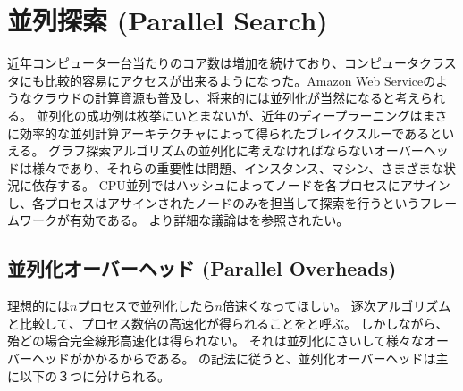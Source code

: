 

\section{並列探索 (Parallel Search)}
\label{sec:parallel-search}

近年コンピュータ一台当たりのコア数は増加を続けており、コンピュータクラスタにも比較的容易にアクセスが出来るようになった。Amazon Web Serviceのようなクラウドの計算資源も普及し、将来的には並列化が当然になると考えられる。
並列化の成功例は枚挙にいとまないが、近年のディープラーニングはまさに効率的な並列計算アーキテクチャによって得られたブレイクスルーであるといえる。
グラフ探索アルゴリズムの並列化に考えなければならないオーバーヘッドは様々であり、それらの重要性は問題、インスタンス、マシン、さまざまな状況に依存する。%
CPU並列ではハッシュによってノードを各プロセスにアサインし、各プロセスはアサインされたノードのみを担当して探索を行うというフレームワークが有効である。
より詳細な議論は\cite{fukunaga2017survey}を参照されたい。

\subsection{並列化オーバーヘッド (Parallel Overheads)}
\label{sec:parallel-overheads}

理想的には$n$プロセスで並列化したら$n$倍速くなってほしい。
逐次アルゴリズムと比較して、プロセス数倍の高速化が得られることをと呼ぶ。
しかしながら、殆どの場合完全線形高速化は得られない。
それは並列化にさいして様々なオーバーヘッドがかかるからである。
\cite{jinnai2017work}の記法に従うと、並列化オーバーヘッドは主に以下の３つに分けられる。


